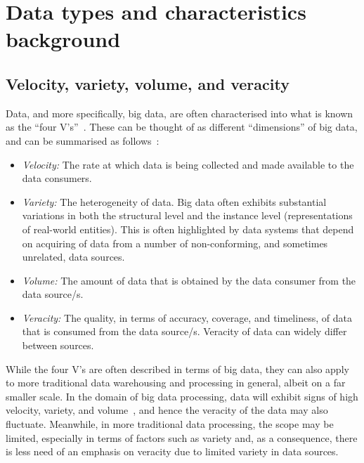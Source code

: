 \documentclass[a4paper,11pt]{article}
\begin{document}

\newpage


\section{Data types and characteristics background} %
\label{sec:big_data_types_background}

\subsection{Velocity, variety, volume, and veracity} %
\label{sub:four_v}

Data, and more specifically, big data, are often characterised into what is known as the ``four V's''~\cite{wang2014bigdatabench}.
These can be thought of as different ``dimensions'' of big data, and can be summarised as follows~\cite{dong2013big}:

\begin{itemize}
  \item \emph{Velocity:} The rate at which data is being collected and made available to the data consumers.
  \item \emph{Variety:} The heterogeneity of data. Big data often exhibits substantial variations in both the structural
  level and the instance level (representations of real-world entities). This is often highlighted by data systems that
  depend on acquiring of data from a number of non-conforming, and sometimes unrelated, data sources.
  \item \emph{Volume:} The amount of data that is obtained by the data consumer from the data source/s.
  \item \emph{Veracity:} The quality, in terms of accuracy, coverage, and timeliness, of data that is consumed from
  the data source/s. Veracity of data can widely differ between sources.
\end{itemize}

While the four V's are often described in terms of big data, they can also apply to more traditional data
warehousing and processing in general, albeit on a far smaller scale. In the domain of big data processing, data will
exhibit signs of high velocity, variety, and volume~\cite{beyer2011gartner}, and hence the veracity of the data may also fluctuate. Meanwhile,
in more traditional data processing, the scope may be limited, especially in terms of factors such as variety and, as a
consequence, there is less need of an emphasis on veracity due to limited variety in data sources.
\end{document}
